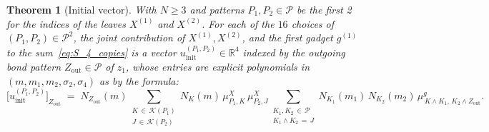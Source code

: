 \documentclass[12pt,a4paper]{article}
\newtheorem{theorem}{Theorem}[section]
\begin{document}
\begin{theorem}[Initial vector]\label{thm:u-init}
With $N \ge 3$ and patterns $P_{1}, P_{2} \in \mathcal{P}$ be the first 2 for the indices of the leaves $X^{(1)}$ and $X^{(2)}$.
For each of the $16$ choices of $(P_{1}, P_{2}) \in \mathcal{P}^{2}$, the joint 
contribution of $X^{(1)}, X^{(2)}$, and the first gadget $g^{(1)}$ to 
the sum~\eqref{eq:S_4_copies} is a vector 
$u^{(P_{1}, P_{2})}_{\mathrm{init}} \in \mathbb{R}^{4}$ indexed by the outgoing bond pattern $Z_{\mathrm{out}} \in \mathcal{P}$ of $z_{1}$, 
whose entries are explicit polynomials in $(m, m_{1}, m_{2}, \sigma_{2}, 
\sigma_{4})$ as by the formula:
\begin{equation}\label{eq:u-init}
\bigl[u^{(P_{1}, P_{2})}_{\mathrm{init}}\bigr]_{Z_{\mathrm{out}}}
\;=\;
N_{Z_{\mathrm{out}}}(m)
\!\!\!\!\!\sum_{\substack{K \,\in\, \mathcal{K}(P_{1}) \\ J \,\in\, \mathcal{K}(P_{2})}}\!\!\!\!\!
N_{K}(m)\, \mu^{X}_{P_{1}, K}\, \mu^{X}_{P_{2}, J}
\!\!\!\!\!\sum_{\substack{K_{1}, K_{2} \,\in\, \mathcal{P} \\ K_{1} \wedge K_{2} \,=\, J}}\!\!\!\!\!
N_{K_{1}}(m_{1})\, N_{K_{2}}(m_{2})\,
\mu^{g}_{\,K \wedge K_{1},\, K_{2} \wedge Z_{\mathrm{out}}}.
\end{equation}


\end{theorem}
\end{document}
